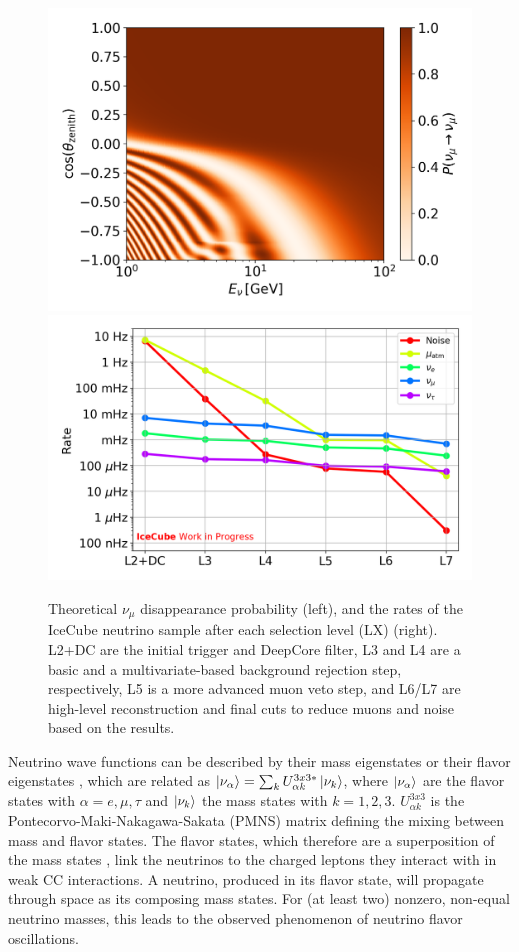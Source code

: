 \documentclass[a4paper,11pt]{article}
\begin{document}
\begin{figure}[h!]
  \includegraphics[width=.44\linewidth]{figures/Oscillogram_numu_numu_orange.png}
  \includegraphics[width=.50\linewidth]{figures/OscNext_high_stats_event_selection_levels.png}
  \caption{Theoretical $\nu_{\mu}$ disappearance probability (left), and the rates of the IceCube neutrino sample after each selection level (LX) (right). L2+DC are the initial trigger and DeepCore filter, L3 and L4 are a basic and a multivariate-based background rejection step, respectively, L5 is a more advanced muon veto step, and L6/L7 are high-level reconstruction and final cuts to reduce muons and noise based on the results.}
  \label{fig:oscnext_sample_and_phasespace}
\end{figure}
Neutrino wave functions can be described by their mass eigenstates or their flavor eigenstates \cite{BILENKY1978225}, which are related as $\ket{\nu_\alpha} = \sum_kU^{3x3*}_{\alpha k}\ket{\nu_k}$, where $\ket{\nu_\alpha}$ are the flavor states with $\alpha=e,\mu,\tau$ and $\ket{\nu_k}$ the mass states with $k=1,2,3$. $U^{3x3}_{\alpha k}$ is the Pontecorvo-Maki-Nakagawa-Sakata (PMNS) matrix defining the mixing between mass and flavor states. The flavor states, which therefore are a superposition of the mass states \cite{PhysRevD.98.030001}, link the neutrinos to the charged leptons they interact with in weak CC interactions. A neutrino, produced in its flavor state, will propagate through space as its composing mass states. For (at least two) nonzero, non-equal neutrino masses, this leads to the observed phenomenon of neutrino flavor oscillations.
\end{document}
